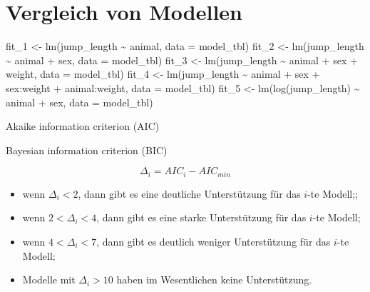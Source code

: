 \documentclass[
  letterpaper,
]{scrbook}
\newenvironment{Shaded}{\begin{snugshade}}{\end{snugshade}}
\newcommand{\AttributeTok}[1]{\textcolor[rgb]{0.40,0.45,0.13}{#1}}
\newcommand{\FunctionTok}[1]{\textcolor[rgb]{0.28,0.35,0.67}{#1}}
\newcommand{\NormalTok}[1]{\textcolor[rgb]{0.00,0.23,0.31}{#1}}
\newcommand{\OtherTok}[1]{\textcolor[rgb]{0.00,0.23,0.31}{#1}}
\newcommand{\SpecialCharTok}[1]{\textcolor[rgb]{0.37,0.37,0.37}{#1}}
\providecommand{\tightlist}{%
  \setlength{\itemsep}{0pt}\setlength{\parskip}{0pt}}\usepackage{longtable,booktabs,array}
\begin{document}
\hypertarget{sec-model-basic-compare}{%
\section{Vergleich von Modellen}\label{sec-model-basic-compare}}

\begin{Shaded}
\begin{Highlighting}[]
\NormalTok{fit\_1 }\OtherTok{\textless{}{-}} \FunctionTok{lm}\NormalTok{(jump\_length }\SpecialCharTok{\textasciitilde{}}\NormalTok{ animal, }\AttributeTok{data =}\NormalTok{ model\_tbl)}
\NormalTok{fit\_2 }\OtherTok{\textless{}{-}} \FunctionTok{lm}\NormalTok{(jump\_length }\SpecialCharTok{\textasciitilde{}}\NormalTok{ animal }\SpecialCharTok{+}\NormalTok{ sex, }\AttributeTok{data =}\NormalTok{ model\_tbl)}
\NormalTok{fit\_3 }\OtherTok{\textless{}{-}} \FunctionTok{lm}\NormalTok{(jump\_length }\SpecialCharTok{\textasciitilde{}}\NormalTok{ animal }\SpecialCharTok{+}\NormalTok{ sex }\SpecialCharTok{+}\NormalTok{ weight, }\AttributeTok{data =}\NormalTok{ model\_tbl)}
\NormalTok{fit\_4 }\OtherTok{\textless{}{-}} \FunctionTok{lm}\NormalTok{(jump\_length }\SpecialCharTok{\textasciitilde{}}\NormalTok{ animal }\SpecialCharTok{+}\NormalTok{ sex }\SpecialCharTok{+}\NormalTok{ sex}\SpecialCharTok{:}\NormalTok{weight }\SpecialCharTok{+}\NormalTok{ animal}\SpecialCharTok{:}\NormalTok{weight, }\AttributeTok{data =}\NormalTok{ model\_tbl)}
\NormalTok{fit\_5 }\OtherTok{\textless{}{-}} \FunctionTok{lm}\NormalTok{(}\FunctionTok{log}\NormalTok{(jump\_length) }\SpecialCharTok{\textasciitilde{}}\NormalTok{ animal }\SpecialCharTok{+}\NormalTok{ sex, }\AttributeTok{data =}\NormalTok{ model\_tbl)}
\end{Highlighting}
\end{Shaded}

Akaike information criterion (AIC)

Bayesian information criterion (BIC)

\[
\Delta_i = AIC_i - AIC_{min}
\]

\begin{itemize}
\tightlist
\item
  wenn \(\Delta_i < 2\), dann gibt es eine deutliche Unterstützung für
  das \(i\)-te Modell;;
\item
  wenn \(2 < \Delta_i < 4\), dann gibt es eine starke Unterstützung für
  das \(i\)-te Modell;
\item
  wenn \(4 < \Delta_i < 7\), dann gibt es deutlich weniger Unterstützung
  für das \(i\)-te Modell;
\item
  Modelle mit \(\Delta_i > 10\) haben im Wesentlichen keine
  Unterstützung.
\end{itemize}
\end{document}
